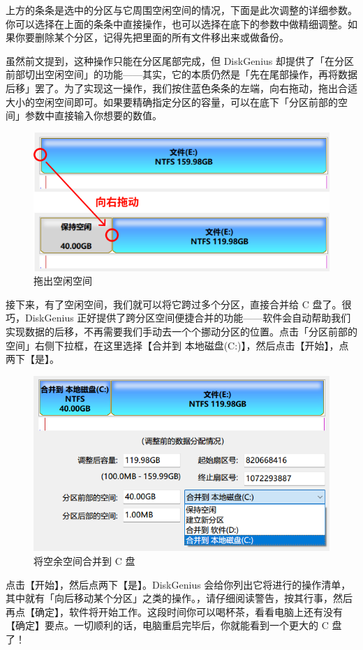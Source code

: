 {上方的条条是选中的分区与它周围空闲空间的情况，下面是此次调整的详细参数。你可以选择在上面的条条中直接操作，也可以选择在底下的参数中做精细调整。如果你要删除某个分区，记得先把里面的所有文件移出来或做备份。

虽然前文提到，这种操作只能在分区尾部完成，但 DiskGenius 却提供了「在分区前部切出空闲空间」的功能——其实，它的本质仍然是「先在尾部操作，再将数据后移」罢了。为了实现这一操作，我们按住蓝色条条的左端，向右拖动，拖出合适大小的空闲空间即可。如果要精确指定分区的容量，可以在底下「分区前部的空间」参数中直接输入你想要的数值。

\begin{figure}[htb!]
  \centering
  \includegraphics[width=.5\textwidth]{assets/advanced/Drag_Size.png}
  \caption{拖出空闲空间}
  \label{fig:Drag_Size}
\end{figure}

接下来，有了空闲空间，我们就可以将它跨过多个分区，直接合并给 C 盘了。很巧，DiskGenius 正好提供了跨分区空间便捷合并的功能——软件会自动帮助我们实现数据的后移，不再需要我们手动去一个个挪动分区的位置。点击「分区前部的空间」右侧下拉框，在这里选择【合并到 本地磁盘(C:)】，然后点击【开始】，点两下【是】。

\begin{figure}[htb!]
  \centering
  \includegraphics[width=.5\textwidth]{assets/advanced/Merge_To_C.png}
  \caption{将空余空间合并到 C 盘}
  \label{fig:Merge_To_C}
\end{figure}

点击【开始】，然后点两下【是】。DiskGenius 会给你列出它将进行的操作清单，其中就有「向后移动某个分区」之类的操作。，请仔细阅读警告，按其行事，然后再点【确定】，软件将开始工作。这段时间你可以喝杯茶，看看电脑上还有没有【确定】要点。一切顺利的话，电脑重启完毕后，你就能看到一个更大的 C 盘了！

}
